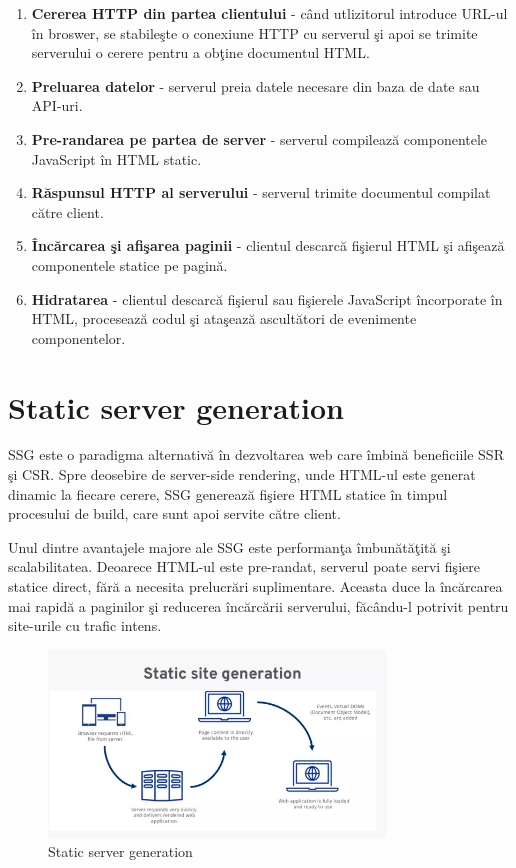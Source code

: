 \documentclass[12pt, a4paper]{report}
\begin{document}
\begin{enumerate}
	\item \textbf{Cererea HTTP din partea clientului} - c\^and utlizitorul introduce URL-ul \^in broswer, se stabile\c ste o conexiune HTTP cu serverul \c si apoi se trimite serverului o cerere pentru a ob\c tine documentul HTML.
	\item \textbf{Preluarea datelor} - serverul preia datele necesare din baza de date sau API-uri.
	\item \textbf{Pre-randarea pe partea de server} - serverul compileaz\u a componentele JavaScript \^in HTML static.
	\item \textbf{R\u aspunsul HTTP al serverului} - serverul trimite documentul compilat c\u atre client.
	\item \textbf{\^Inc\u arcarea \c si afi\c sarea paginii} - clientul descarc\u a fi\c sierul HTML \c si afi\c seaz\u a componentele statice pe pagin\u a.
	\item \textbf{Hidratarea} - clientul descarc\u a fi\c sierul sau fi\c sierele JavaScript \^incorporate \^in HTML, proceseaz\u a codul \c si ata\c seaz\u a ascult\u atori de evenimente componentelor.
\end{enumerate} \cite{improve-ssr-speed}

\section{Static server generation}

SSG este o paradigma alternativ\u a \^in dezvoltarea web care \^imbin\u a beneficiile SSR \c si CSR. Spre deosebire de server-side rendering, unde HTML-ul este generat dinamic la fiecare cerere, SSG genereaz\u a fi\c siere HTML statice \^in timpul procesului de build, care sunt apoi servite c\u atre client.

Unul dintre avantajele majore ale SSG este performan\c ta \^imbun\u at\u a\c tit\u a \c si scalabilitatea. Deoarece HTML-ul este pre-randat, serverul poate servi fi\c siere statice direct, f\u ar\u a a necesita prelucr\u ari suplimentare. Aceasta duce la \^inc\u arcarea mai rapid\u a a paginilor \c si reducerea \^inc\u arc\u arii serverului, f\u ac\^andu-l potrivit pentru site-urile cu trafic intens. 

\begin{figure}[htbp]
	\centering
	\includegraphics[width=0.8\textwidth]{ssg-diagram.png}
	\caption{Static server generation \protect\footnotemark}
	\label{fig:ssg}
\end{figure}
\end{document}
